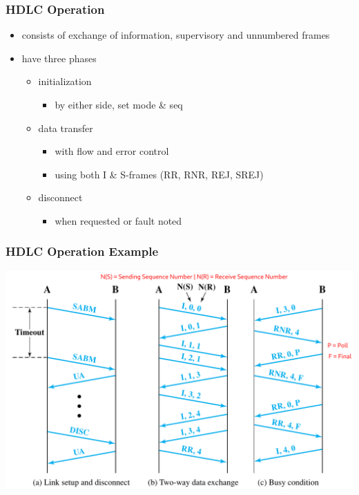 \documentclass[pdflatex,compress]{beamer}
\begin{document}
\begin{frame}
	\frametitle{HDLC Operation}
	\begin{itemize}
		\item consists of exchange of information, supervisory and unnumbered frames
		\item have three phases
		\begin{itemize}
			\item initialization
			\begin{itemize}
				\item by either side, set mode \& seq
			\end{itemize}
			\item data transfer
			\begin{itemize}
				\item with flow and error control
				\item using both I \& S-frames (RR, RNR, REJ, SREJ)
			\end{itemize}
			\item disconnect
			\begin{itemize}
				\item when requested or fault noted
			\end{itemize}
		\end{itemize}
	\end{itemize}
\end{frame}

\begin{frame}
	\frametitle{HDLC Operation Example}
	\begin{center}
		\includegraphics[height=0.8\textheight]{img/img13}
	\end{center}
\end{frame}
\end{document}
